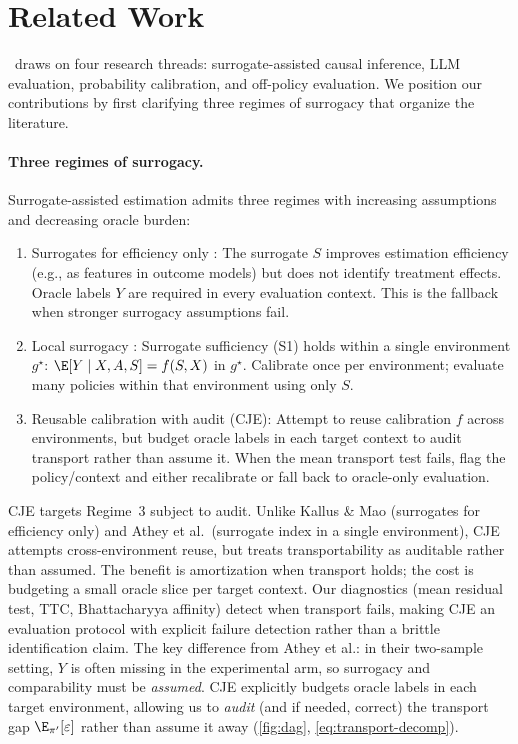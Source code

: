 \section{Related Work}
\label{sec:related}

\CJE\ draws on four research threads: surrogate-assisted causal inference, LLM evaluation, probability calibration, and off-policy evaluation. We position our contributions by first clarifying three regimes of surrogacy that organize the literature.

\paragraph{Three regimes of surrogacy.}
Surrogate-assisted estimation admits three regimes with increasing assumptions and decreasing oracle burden:

\begin{enumerate}[leftmargin=*,itemsep=2pt,topsep=2pt]
\item Surrogates for efficiency only \citep{KallusMao2020Surrogates}: The surrogate $S$ improves estimation efficiency (e.g., as features in outcome models) but does not identify treatment effects. Oracle labels $Y$ are required in every evaluation context. This is the fallback when stronger surrogacy assumptions fail.

\item Local surrogacy \citep{AtheyChettyImbensKang2019,Prentice1989Surrogate}: Surrogate sufficiency (S1) holds within a single environment $g^\star$: $\E[Y \mid X, A, S] = f(S, X)$ in $g^\star$. Calibrate once per environment; evaluate many policies within that environment using only $S$.

\item Reusable calibration with audit (CJE): Attempt to reuse calibration $f$ across environments, but budget oracle labels in each target context to audit transport rather than assume it. When the mean transport test fails, flag the policy/context and either recalibrate or fall back to oracle-only evaluation.
\end{enumerate}

\noindent CJE targets Regime~3 subject to audit. Unlike Kallus \& Mao (surrogates for efficiency only) and Athey et al.\ (surrogate index in a single environment), CJE attempts cross-environment reuse, but treats transportability as auditable rather than assumed. The benefit is amortization when transport holds; the cost is budgeting a small oracle slice per target context. Our diagnostics (mean residual test, TTC, Bhattacharyya affinity) detect when transport fails, making CJE an evaluation protocol with explicit failure detection rather than a brittle identification claim.
The key difference from Athey et al.: in their two-sample setting, $Y$ is often missing in the experimental arm, so surrogacy and comparability must be \emph{assumed}. CJE explicitly budgets oracle labels in each target environment, allowing us to \emph{audit} (and if needed, correct) the transport gap $\E_{\pi'}[\varepsilon]$ rather than assume it away (\cref{fig:dag}, \cref{eq:transport-decomp}).

